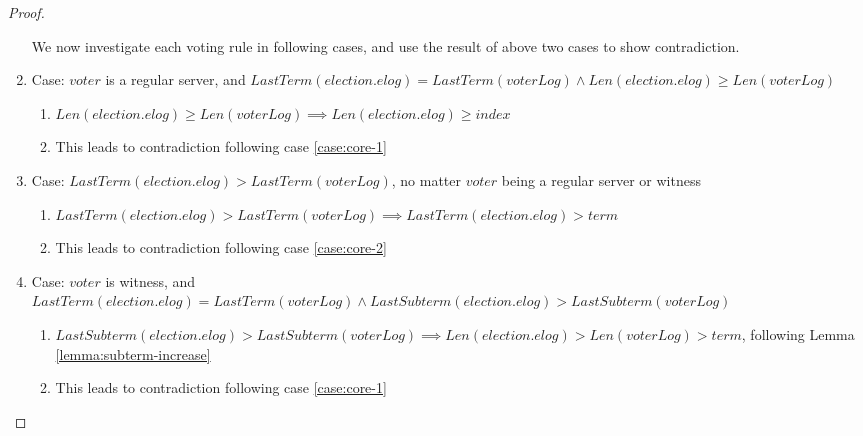 \begin{proof}
\begin{enumerate}
	    We now investigate each voting rule in following cases, and use the result of above two cases to show contradiction.

		\item Case: \label{case:1} $voter$ is a regular server, and $LastTerm(election.elog) = LastTerm(voterLog) \land Len(election.elog) \ge Len(voterLog)$
		\begin{enumerate}
			\item $Len(election.elog) \ge Len(voterLog) \implies Len(election.elog) \ge index$
			\item This leads to contradiction following case \ref{case:core-1}
		\end{enumerate}

		\item Case: \label{case:2} $LastTerm(election.elog) > LastTerm(voterLog)$, no matter $voter$ being a regular server or witness
		\begin{enumerate}
			\item $LastTerm(election.elog) > LastTerm(voterLog) \implies LastTerm(election.elog) > term$
			\item This leads to contradiction following case \ref{case:core-2}
		\end{enumerate}

		\item Case: \label{case:3} $voter$ is witness, and $LastTerm(election.elog) = LastTerm(voterLog) \land LastSubterm(election.elog) > LastSubterm(voterLog)$
		\begin{enumerate}
			\item $LastSubterm(election.elog) > LastSubterm(voterLog) \implies Len(election.elog) > Len(voterLog) > term$, following Lemma \ref{lemma:subterm-increase}
			\item This leads to contradiction following case \ref{case:core-1}
		\end{enumerate}


\end{enumerate}
\end{proof}

